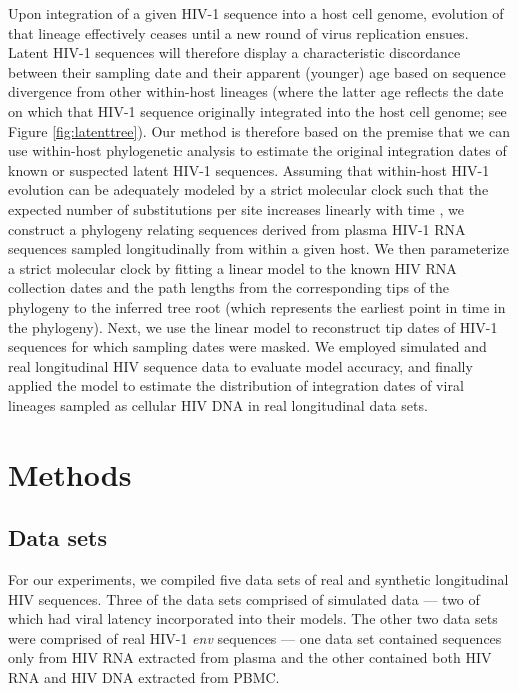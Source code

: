 \documentclass[12pt]{article}
\begin{document}
Upon integration of a given HIV-1 sequence into a host cell genome, evolution of that lineage effectively ceases until a new round of virus replication ensues.
Latent HIV-1 sequences will therefore display a characteristic discordance between their sampling date and their apparent (younger) age based on sequence divergence from other within-host lineages (where the latter age reflects the date on which that HIV-1 sequence originally integrated into the host cell genome; see Figure \ref{fig:latenttree}).
Our method is therefore based on the premise that we can use within-host phylogenetic analysis to estimate the original integration dates of known or suspected latent HIV-1 sequences.
Assuming that within-host HIV-1 evolution can be adequately modeled by a strict molecular clock such that the expected number of substitutions per site increases linearly with time \cite{Ho14}, we construct a phylogeny relating sequences derived from plasma HIV-1 RNA sequences sampled longitudinally from within a given host. We then parameterize a strict molecular clock by fitting a linear model to the known HIV RNA collection dates and the path lengths from the corresponding tips of the phylogeny to the inferred tree root (which represents the earliest point in time in the phylogeny).
Next, we use the linear model to reconstruct tip dates of HIV-1 sequences for which sampling dates were masked. 
We employed simulated and real longitudinal HIV sequence data to evaluate model accuracy, and finally applied the model to estimate the distribution of integration dates of viral lineages sampled as cellular HIV DNA in real longitudinal data sets.


\section * {Methods} \label{sec:methods}

\subsection * {Data sets}
For our experiments, we compiled five data sets of real and synthetic longitudinal HIV sequences.
Three of the data sets comprised of simulated data --- two of which had viral latency incorporated into their models.
The other two data sets were comprised of real HIV-1 \emph{env} sequences --- one data set contained sequences only from HIV RNA extracted from plasma and the other contained both HIV RNA and HIV DNA extracted from PBMC.
\end{document}
